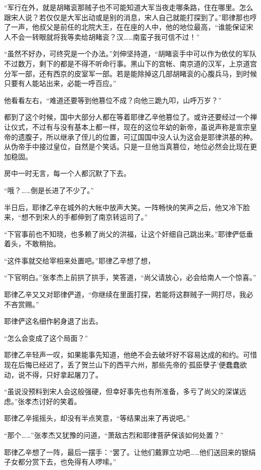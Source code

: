 “军行在外，就是胡睹衮那贼子也不可能知道大军当夜走哪条路，住在哪里。怎么跟宋人说？若仅仅是大军出动或是别的消息，宋人自己就能打探到了。”耶律那也哼了一声，他叔父是前任的北院大王，在在座的人中，他的地位最高，“谁能保证宋人不会一转眼就将我等卖给胡睹衮？汉……南蛮子我可信不过！”

“虽然不好办，可终究是一个办法。”刘伸坚持道，“胡睹衮手中可以作为依仗的军队不过数万，剩下的都是不得不听命行事。黑山下的宫帐、南京道的汉军，上京道宫分军一部，还有西京的皮室军一部。若是能除掉这几部胡睹衮的心腹兵马，到时候只要有人能站出来，必能一呼百应。”

他看看左右，“难道还要等到他篡位不成？向他三跪九叩，山呼万岁？”

都到了这个时候，国中大部分人都在等着耶律乙辛他篡位了。或许还要经过一个禅让仪式，不过有与没有基本上都一样，现在的这位年幼的新帝，虽说声称是宣宗皇帝的遗腹子，所以继承了侄儿的位置，可辽国国中没人认为这会是耶律洪基的种。从伪帝手中接过皇位，自然是个笑话。只是一旦他当真篡位，地位必然会比现在更加稳固。

房中一时无言，每一个人都沉默了下去。

“哦？……倒是长进了不少了。”

半日后，耶律乙辛在城外的大帐中放声大笑。一阵畅快的笑声之后，他又冷下脸来，“想不到宋人的手都伸到了南京转运司了。”

“下官事前也不知晓，也多赖了尚父的洪福，让这个奸细自己跳出来。”耶律俨低垂着头，不敢稍抬。

“这件事就交给宰相来处置吧。”耶律乙辛想了想，

“下官明白。”张孝杰上前拱了拱手，笑答道，“尚父请放心，必会给南人一个惊喜。”

耶律乙辛又又对耶律俨道，“你继续在里面打探，若能将这群贼子一网打尽，我必不吝赏赐。”

耶律俨这名细作躬身退了出去。

“怎么会变成了这个局面？”

耶律乙辛轻声一叹，如果能事先知道，他绝不会去破坏好不容易达成的和约。可惜现在后悔已经迟了，丢了贺兰山下的西平六州，那些先帝的‘孤臣孽子’便蠢蠢欲动，说不得，只好拿起屠刀了。

“虽说没预料到宋人会这般强硬，但幸好事先也有所准备，多亏了尚父的深谋远虑。”张孝杰讨好的笑着。

耶律乙辛摇摇头，却没有半点笑意，“等结果出来了再说吧。”

“那个……”张孝杰又犹豫的问道，“萧敌古烈和耶律菩萨保该如何处置？”

耶律乙辛想了一阵，最后一摆手：“罢了。让他们戴罪立功吧……他们送回来的银绢子女都分赏下去，也免得有人啰嗦。”

